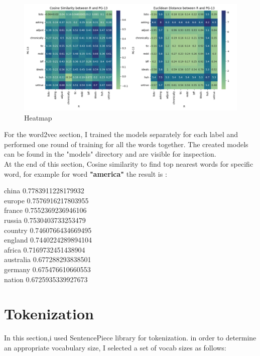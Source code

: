 \documentclass[a4paper]{article}
\begin{document}
\begin{figure}[ht]
    \centering
    \includegraphics[width=1\textwidth]{../stats/HeatMap_R_PG-13.png}
    \caption{Heatmap}
\end{figure}

\FloatBarrier

For the word2vec section, I trained the models separately for each label and performed one round of training for all the words together. The created models can be found in the "models" directory and are visible for inspection.\\

At the end of this section, Cosine similarity to find top nearest words for specific word, for example for word \textbf{"america"} the result is : \\

\begin{center}
china 0.7783911228179932\\
europe 0.7576916217803955\\
france 0.7552369236946106\\
russia 0.7530403733253479\\
country 0.7460766434669495\\
england 0.7440224289894104\\
africa 0.7169732451438904\\
australia 0.677288293838501\\
germany 0.675476610660553\\
nation 0.6725935339927673\\
\end{center}

\section{Tokenization}

In this section,i used SentencePiece library for tokenization. in order to determine an appropriate vocabulary size, I selected a set of vocab sizes as follows:
\end{document}
